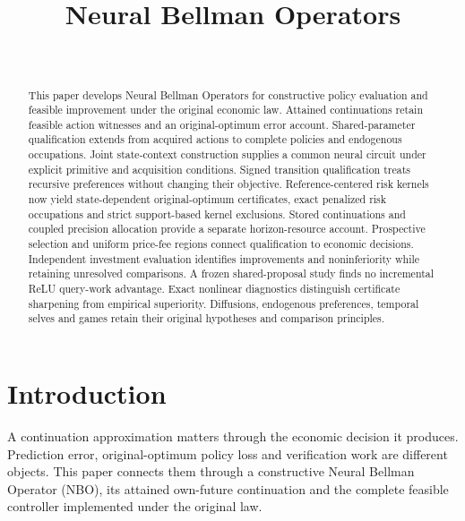 \documentclass[ecta,nameyear,draft]{econsocart}
\begin{document}
\begin{frontmatter}
\title{Neural Bellman Operators}
\begin{aug}
\author[id=au1,addressref={add1}]{~}
\address[id=add1]{Peking University}
\end{aug}
\begin{abstract}
This paper develops Neural Bellman Operators for constructive policy evaluation and feasible improvement under the original economic law. Attained continuations retain feasible action witnesses and an original-optimum error account. Shared-parameter qualification extends from acquired actions to complete policies and endogenous occupations. Joint state-context construction supplies a common neural circuit under explicit primitive and acquisition conditions. Signed transition qualification treats recursive preferences without changing their objective. Reference-centered risk kernels now yield state-dependent original-optimum certificates, exact penalized risk occupations and strict support-based kernel exclusions. Stored continuations and coupled precision allocation provide a separate horizon-resource account. Prospective selection and uniform price-fee regions connect qualification to economic decisions. Independent investment evaluation identifies improvements and noninferiority while retaining unresolved comparisons. A frozen shared-proposal study finds no incremental ReLU query-work advantage. Exact nonlinear diagnostics distinguish certificate sharpening from empirical superiority. Diffusions, endogenous preferences, temporal selves and games retain their original hypotheses and comparison principles.
\end{abstract}
\begin{keyword}
\end{keyword}
\end{frontmatter}
\section{Introduction}\label{sec:introduction65}
A continuation approximation matters through the economic decision it produces. Prediction error, original-optimum policy loss and verification work are different objects. This paper connects them through a constructive Neural Bellman Operator (NBO), its attained own-future continuation and the complete feasible controller implemented under the original law.
\end{document}
